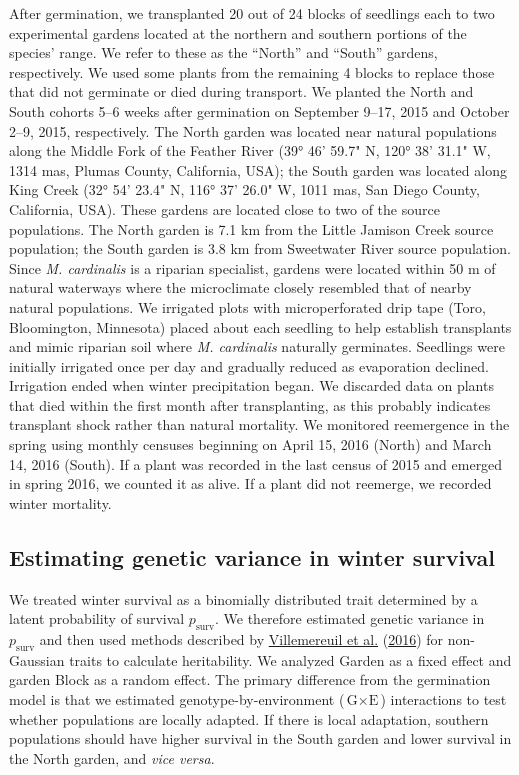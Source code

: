 \documentclass[
  12pt,
]{article}
\begin{document}
After germination, we transplanted 20 out of 24 blocks of seedlings each to two experimental gardens located at the northern and southern portions of the species' range. We refer to these as the ``North'' and ``South'' gardens, respectively. We used some plants from the remaining 4 blocks to replace those that did not germinate or died during transport. We planted the North and South cohorts 5--6 weeks after germination on September 9--17, 2015 and October 2--9, 2015, respectively. The North garden was located near natural populations along the Middle Fork of the Feather River (39° 46' 59.7" N, 120° 38' 31.1" W, 1314 mas, Plumas County, California, USA); the South garden was located along King Creek (32° 54' 23.4" N, 116° 37' 26.0" W, 1011 mas, San Diego County, California, USA). These gardens are located close to two of the source populations. The North garden is 7.1 km from the Little Jamison Creek source population; the South garden is 3.8 km from Sweetwater River source population. Since \textit{M. cardinalis} is a riparian specialist, gardens were located within 50 m of natural waterways where the microclimate closely resembled that of nearby natural populations. We irrigated plots with microperforated drip tape (Toro, Bloomington, Minnesota) placed about each seedling to help establish transplants and mimic riparian soil where \textit{M. cardinalis} naturally germinates. Seedlings were initially irrigated once per day and gradually reduced as evaporation declined. Irrigation ended when winter precipitation began. We discarded data on plants that died within the first month after transplanting, as this probably indicates transplant shock rather than natural mortality. We monitored reemergence in the spring using monthly censuses beginning on April 15, 2016 (North) and March 14, 2016 (South). If a plant was recorded in the last census of 2015 and emerged in spring 2016, we counted it as alive. If a plant did not reemerge, we recorded winter mortality.

\hypertarget{estimating-genetic-variance-in-winter-survival}{%
\subsection{Estimating genetic variance in winter survival}\label{estimating-genetic-variance-in-winter-survival}}

We treated winter survival as a binomially distributed trait determined by a latent probability of survival \(p_\text{surv}\). We therefore estimated genetic variance in \(p_\text{surv}\) and then used methods described by \protect\hyperlink{ref-de_villemereuil_general_2016}{Villemereuil et al.} (\protect\hyperlink{ref-de_villemereuil_general_2016}{2016}) for non-Gaussian traits to calculate heritability. We analyzed Garden as a fixed effect and garden Block as a random effect. The primary difference from the germination model is that we estimated genotype-by-environment (\(\text{G}\times\text{E}\)) interactions to test whether populations are locally adapted. If there is local adaptation, southern populations should have higher survival in the South garden and lower survival in the North garden, and \emph{vice versa}.
\end{document}
